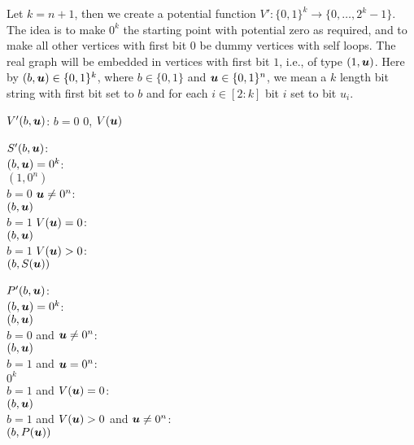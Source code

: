 Let $k=n+1$, then we create a potential function $V':\{0,1\}^k \rightarrow
\{0,\dots,2^k-1\}$. 
The idea is to make $0^k$ the starting point with potential zero as required,
and to make all other vertices with first bit $0$ be dummy vertices with self
loops. The real graph
will be embedded in vertices with first bit $1$, i.e., of type $(1,\mbox{\boldmath $u$})$. Here
by $(b,\mbox{\boldmath $u$})\in \{0,1\}^k$, where $b\in \{0,1\}$ and $\mbox{\boldmath $u$}\in \{0,1\}^n$, we mean
a $k$ length bit string with first bit set to $b$ and for each $i\in[2:k]$ bit $i$ 
set to bit $u_i$.
\begin{algo}
  $V'(b,\mbox{\boldmath $u$})$: \IfB $b = 0$ \ReturnB $0$, \ElseB \ReturnB $V(\mbox{\boldmath $u$})$
\end{algo}

\begin{algo}
  \underline{$S'(b,\mbox{\boldmath $u$})$}:\+
  \\\IfB $(b,\mbox{\boldmath $u$})=0^k$:\+
  \\  \ReturnB $(1,0^n)$\-
  \\\IfB $b=0$ \AndB $\mbox{\boldmath $u$}\neq 0^n$:\+
  \\  \ReturnB $(b,\mbox{\boldmath $u$})$ \-
  \\\IfB $b=1$ \AndB $V(\mbox{\boldmath $u$})=0$:\+
  \\  \ReturnB $(b,\mbox{\boldmath $u$})$ \-
  \\\IfB $b=1$ \AndB $V(\mbox{\boldmath $u$})>0$:\+
  \\  \ReturnB $(b,S(\mbox{\boldmath $u$}))$ \-
\end{algo}

\begin{algo}
  \underline{$P'(b,\mbox{\boldmath $u$})$}:\+
  \\\IfB $(b,\mbox{\boldmath $u$})=0^k$:\+
  \\  \ReturnB $(b,\mbox{\boldmath $u$})$ \-
  \\\IfB $b=0$ and $\mbox{\boldmath $u$}\neq 0^n$:\+
  \\  \ReturnB $(b,\mbox{\boldmath $u$})$ \-
  \\\IfB $b=1$ and $\mbox{\boldmath $u$}=0^n$:\+
  \\  \ReturnB $0^k$ \-
  \\\IfB $b=1$ and $V(\mbox{\boldmath $u$})=0$:\+
  \\  \ReturnB $(b,\mbox{\boldmath $u$})$ \-
  \\\IfB $b=1$ and $V(\mbox{\boldmath $u$})>0$ and $\mbox{\boldmath $u$} \neq 0^n$:\+
  \\  \ReturnB $(b,P(\mbox{\boldmath $u$}))$ \-
\end{algo}


